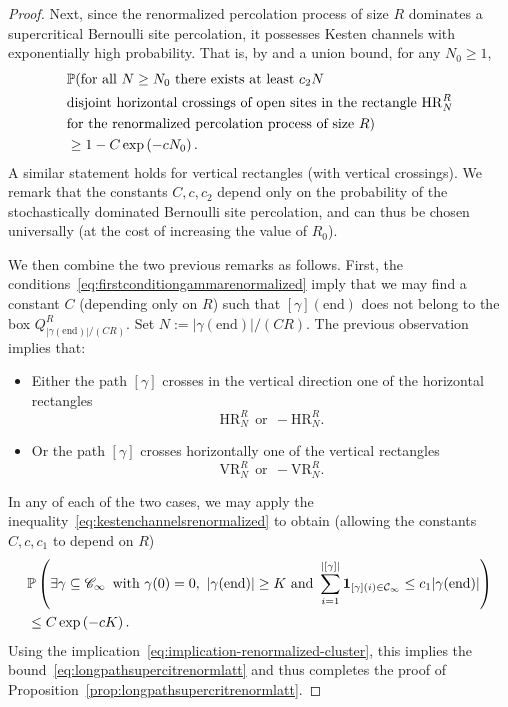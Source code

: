 \documentclass[12pt]{amsart}
\numberwithin{equation}{section}
\begin{document}
\begin{proof}
		Next, since the renormalized percolation process of size $R$ dominates a supercritical Bernoulli site percolation, it possesses Kesten channels with exponentially high probability. 
		That is, by \cite[Theorem 11.1]{kesten-book} and a union bound,  for any $N_0 \geq 1$,
		\begin{equation}
			\begin{aligned} \label{eq:kestenchannelsrenormalized}
				&\P (\mbox{for all $N \geq N_0$ there exists at least $c_2 N$} \\
				&\mbox{disjoint horizontal crossings of open sites in the rectangle $\mathrm{HR}^R_N $} \\
				&\mbox{for the renormalized percolation process of size $R$} )\\
				&\geq 1 - C \exp \left( - c N_0 \right).
			\end{aligned}
		\end{equation}
		A similar statement holds for vertical rectangles (with vertical crossings). We remark that the constants $C , c, c_2$ depend only on the probability of the stochastically dominated Bernoulli site percolation, and can thus be chosen universally (at the cost of increasing the value of $R_0$).
		
		We then combine the two previous remarks as follows. First, the conditions~\eqref{eq:firstconditiongammarenormalized} imply that we may find a  constant $C$ (depending only on $R$) such that $[\gamma](\mathrm{end})$ does not belong to the box $Q^{R}_{|\gamma(\mathrm{end})|/(CR)}$. Set $N := |\gamma(\mathrm{end})|/(CR)$. The previous observation implies that:
		\begin{itemize}
			\item Either the path $[\gamma]$ crosses in the vertical direction one of the horizontal rectangles 
			$$\mathrm{HR}^R_{N} ~~\mbox{or} ~~ - \mathrm{HR}^R_{N}.$$
			\item Or the path $[\gamma]$ crosses horizontally one of the vertical rectangles 
			$$ \mathrm{VR}^R_{N} ~~\mbox{or}~~ -\mathrm{VR}^R_{N}.$$
		\end{itemize}
		In any of each of the two cases, we may apply the inequality~\eqref{eq:kestenchannelsrenormalized} to obtain (allowing the constants $C , c, c_1$ to depend on $R$)
		\begin{align*}
			&\P \left( \exists \gamma \subseteq \mathscr{C}_\infty \, \mbox{ with } \gamma(0) = 0,~  \left| \gamma(\mathrm{end}) \right| \geq K ~\mbox{and}~ \sum_{i = 1}^{|[\gamma]|} \indc_{[\gamma](i) \in \mathcal{C}_\infty } \leq c_1 | \gamma(\mathrm{end}) |  \right) \\
			&\leq C \exp \left( - c K \right).
		\end{align*}
		Using the implication~\eqref{eq:implication-renormalized-cluster}, this implies the bound~\eqref{eq:longpathsupercitrenormlatt} and thus completes the proof of Proposition~\ref{prop:longpathsupercritrenormlatt}. 
	\end{proof}
	
\end{document}
